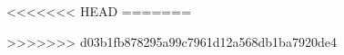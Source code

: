 \documentclass[12pt,letterpaper]{book}
\theoremstyle{example}
\newcommand{\tofc}[1]{#1} %
\begin{document}
\tofc{
\renewcommand{\thepage}{\roman{page}}
\tableofcontents{}

\newpage{}
}

\renewcommand{\thepage}{\arabic{page}}
\setcounter{page}{1}


% 




%
<<<<<<< HEAD
%
=======

>>>>>>> d03b1fb878295a99c7961d12a568db1ba7920de4

%


%
\end{document}

